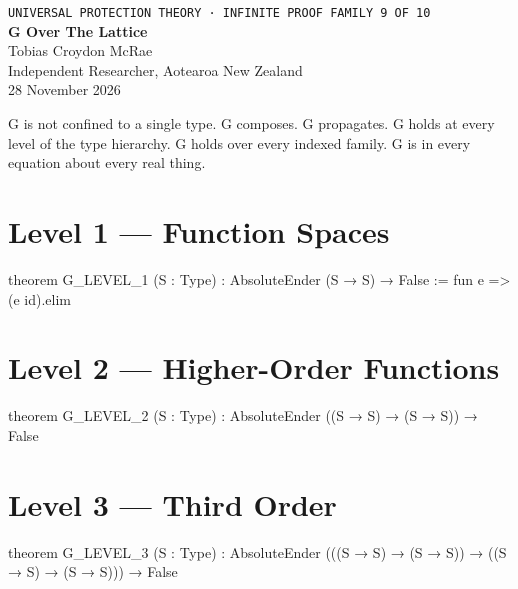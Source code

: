 




\begin{center}
{\small\texttt{UNIVERSAL PROTECTION THEORY · INFINITE PROOF FAMILY 9 OF 10}}\\[1.5em]
{\Huge\bfseries\color{korugreen} G Over The Lattice}\\[1em]
{\large Tobias Croydon McRae}\\[0.3em]
{\small Independent Researcher, Aotearoa New Zealand}\\[0.3em]
{\small 28 November 2026}
\end{center}

\bigskip

\noindent G is not confined to a single type. G composes. G propagates. G holds at every level of the type hierarchy. G holds over every indexed family. G is in every equation about every real thing.

\section{Level 1 — Function Spaces}

\begin{leancode}
theorem G_LEVEL_1 (S : Type) :
     AbsoluteEnder (S → S) → False :=
     fun e => (e id).elim
\end{leancode}

\axiombadge

\section{Level 2 — Higher-Order Functions}

\begin{leancode}
theorem G_LEVEL_2 (S : Type) :
     AbsoluteEnder ((S → S) → (S → S)) → False
\end{leancode}

\axiombadge

\section{Level 3 — Third Order}

\begin{leancode}
theorem G_LEVEL_3 (S : Type) :
     AbsoluteEnder (((S → S) → (S → S)) →
                             ((S → S) → (S → S))) → False
\end{leancode}

